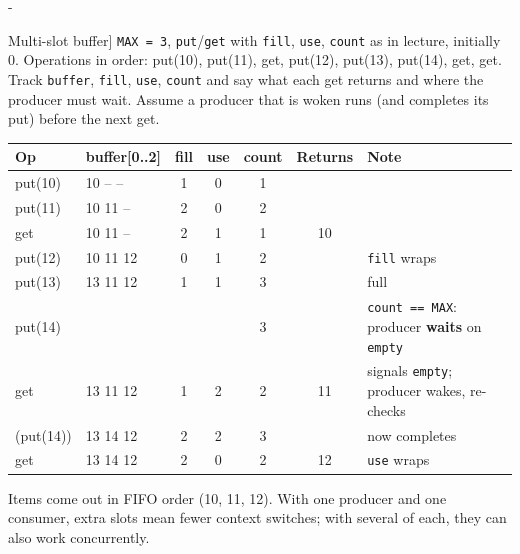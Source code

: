 \documentclass[11pt,a4paper]{article}
\makeatletter
\newcommand{\keepspace}[1]{\par\penalty-100\begingroup
  \setlength{\dimen@}{#1}\dimen@ii\pagegoal\advance\dimen@ii-\pagetotal
  \ifdim\dimen@>\dimen@ii\ifdim\dimen@ii>\z@\vfil\fi\break\fi\endgroup}
\newcounter{qn}[section]
\newcommand{\lecno}{}
\newenvironment{Qn}[2]{\refstepcounter{qn}\keepspace{8\baselineskip}%
  \begin{quizbox}[Q\lecno.\theqn\ \ [#1] #2]}{\end{quizbox}}
\newenvironment{Sol}{\begin{solbox}[Solution]}{\end{solbox}\vspace{0.4em}}
\makeatother
\begin{document}
\begin{Qn}{Trace}{Multi-slot buffer}
\texttt{MAX = 3}, \texttt{put}/\texttt{get} with \texttt{fill},
\texttt{use}, \texttt{count} as in lecture, initially 0. Operations in
order: put(10), put(11), get, put(12), put(13), put(14), get, get. Track
\texttt{buffer}, \texttt{fill}, \texttt{use}, \texttt{count} and say what
each get returns and where the producer must wait. Assume a producer that
is woken runs (and completes its put) before the next get.
\end{Qn}
\begin{Sol}
\begin{center}
\small
\begin{tabular}{@{}llccccl@{}}
  \toprule
  \textbf{Op} & \textbf{buffer[0..2]} & \textbf{fill} & \textbf{use} & \textbf{count} & \textbf{Returns} & \textbf{Note} \\
  \midrule
  put(10) & 10 -- -- & 1 & 0 & 1 & & \\
  put(11) & 10 11 -- & 2 & 0 & 2 & & \\
  get     & 10 11 -- & 2 & 1 & 1 & 10 & \\
  put(12) & 10 11 12 & 0 & 1 & 2 & & \texttt{fill} wraps \\
  put(13) & 13 11 12 & 1 & 1 & 3 & & full \\
  put(14) & & & & 3 & & \texttt{count == MAX}: producer \textbf{waits} on \texttt{empty} \\
  get     & 13 11 12 & 1 & 2 & 2 & 11 & signals \texttt{empty}; producer wakes, re-checks \\
  (put(14)) & 13 14 12 & 2 & 2 & 3 & & now completes \\
  get     & 13 14 12 & 2 & 0 & 2 & 12 & \texttt{use} wraps \\
  \bottomrule
\end{tabular}
\end{center}
Items come out in FIFO order (10, 11, 12). With one producer and one
consumer, extra slots mean fewer context switches; with several of each,
they can also work concurrently.
\end{Sol}
\end{document}
